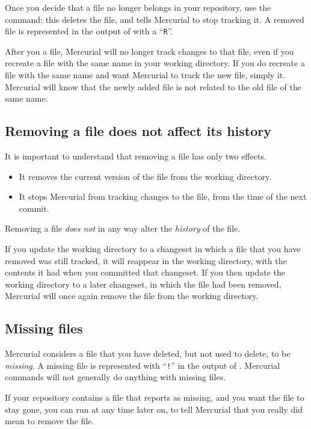 Once you decide that a file no longer belongs in your repository, use
the  command; this deletes the file, and tells Mercurial
to stop tracking it.  A removed file is represented in the output of
 with a ``\texttt{R}''.

After you  a file, Mercurial will no longer track
changes to that file, even if you recreate a file with the same name
in your working directory.  If you do recreate a file with the same
name and want Mercurial to track the new file, simply  it.
Mercurial will know that the newly added file is not related to the
old file of the same name.

\subsection{Removing a file does not affect its history}

It is important to understand that removing a file has only two
effects.
\begin{itemize}
\item It removes the current version of the file from the working
  directory.
\item It stops Mercurial from tracking changes to the file, from the
  time of the next commit.
\end{itemize}
Removing a file \emph{does not} in any way alter the \emph{history} of
the file.

If you update the working directory to a changeset in which a file
that you have removed was still tracked, it will reappear in the
working directory, with the contents it had when you committed that
changeset.  If you then update the working directory to a later
changeset, in which the file had been removed, Mercurial will once
again remove the file from the working directory.

\subsection{Missing files}

Mercurial considers a file that you have deleted, but not used
 to delete, to be \emph{missing}.  A missing file is
represented with ``\texttt{!}'' in the output of .
Mercurial commands will not generally do anything with missing files.

If your repository contains a file that  reports as
missing, and you want the file to stay gone, you can run
 at any time later on, to
tell Mercurial that you really did mean to remove the file.

